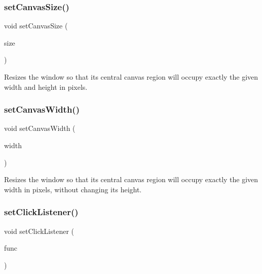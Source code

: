 \subsubsection{\texorpdfstring{set\+Canvas\+Size()}{setCanvasSize()}\hspace{0.1cm}{\footnotesize\ttfamily [2/2]}}
{\footnotesize\ttfamily void set\+Canvas\+Size (\begin{DoxyParamCaption}\item[{const \mbox{\hyperlink{structGDimension}{G\+Dimension}} \&}]{size }\end{DoxyParamCaption})\hspace{0.3cm}{\ttfamily [virtual]}}



Resizes the window so that its central canvas region will occupy exactly the given width and height in pixels. 

\mbox{\label{classGWindow_a455beafcfc20a2b7d9ac00499e222f0f}} 
\subsubsection{\texorpdfstring{set\+Canvas\+Width()}{setCanvasWidth()}}
{\footnotesize\ttfamily void set\+Canvas\+Width (\begin{DoxyParamCaption}\item[{double}]{width }\end{DoxyParamCaption})\hspace{0.3cm}{\ttfamily [virtual]}}



Resizes the window so that its central canvas region will occupy exactly the given width in pixels, without changing its height. 

\mbox{\label{classGWindow_abd40af6921242584d0954f173911b190}} 
\subsubsection{\texorpdfstring{set\+Click\+Listener()}{setClickListener()}\hspace{0.1cm}{\footnotesize\ttfamily [1/2]}}
{\footnotesize\ttfamily void set\+Click\+Listener (\begin{DoxyParamCaption}\item[{G\+Event\+Listener}]{func }\end{DoxyParamCaption})\hspace{0.3cm}{\ttfamily [virtual]}}




